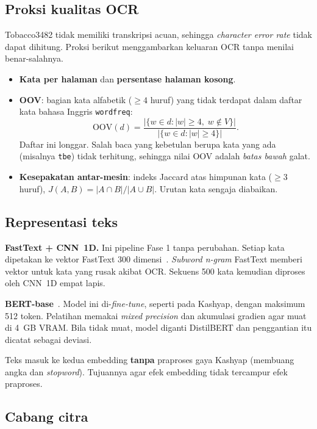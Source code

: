 \documentclass[11pt,a4paper]{article}
\begin{document}
\subsection{Proksi kualitas OCR}\label{sec:proksi}

Tobacco3482 tidak memiliki transkripsi acuan, sehingga \textit{character error rate}
tidak dapat dihitung. Proksi berikut menggambarkan keluaran OCR tanpa menilai
benar-salahnya.

\begin{itemize}
  \item \textbf{Kata per halaman} dan \textbf{persentase halaman kosong}.
  \item \textbf{OOV}: bagian kata alfabetik ($\geq 4$ huruf) yang tidak terdapat dalam
  daftar kata bahasa Inggris \texttt{wordfreq}:
  \[
  \text{OOV}(d) = \frac{|\{w \in d : |w| \geq 4,\; w \notin V\}|}{|\{w \in d : |w| \geq 4\}|}.
  \]
  Daftar ini longgar. Salah baca yang kebetulan berupa kata yang ada (misalnya
  \texttt{tbe}) tidak terhitung, sehingga nilai OOV adalah \emph{batas bawah} galat.
  \item \textbf{Kesepakatan antar-mesin}: indeks Jaccard atas himpunan kata ($\geq 3$
  huruf), $J(A,B) = |A \cap B| / |A \cup B|$. Urutan kata sengaja diabaikan.
\end{itemize}

\subsection{Representasi teks}

\textbf{FastText + CNN~1D.} Ini pipeline Fase 1 tanpa perubahan. Setiap kata dipetakan
ke vektor FastText 300 dimensi~\cite{bojanowski2017}. \textit{Subword n-gram} FastText
memberi vektor untuk kata yang rusak akibat OCR. Sekuens 500 kata kemudian diproses oleh
CNN~1D empat lapis.

\textbf{BERT-base}~\cite{devlin2019}. Model ini di-\textit{fine-tune}, seperti pada
Kashyap, dengan maksimum 512 token. Pelatihan memakai \textit{mixed precision} dan
akumulasi gradien agar muat di 4~GB VRAM. Bila tidak muat, model diganti DistilBERT dan
penggantian itu dicatat sebagai deviasi.

Teks masuk ke kedua embedding \textbf{tanpa} praproses gaya Kashyap (membuang angka dan
\textit{stopword}). Tujuannya agar efek embedding tidak tercampur efek praproses.

\subsection{Cabang citra}
\end{document}
